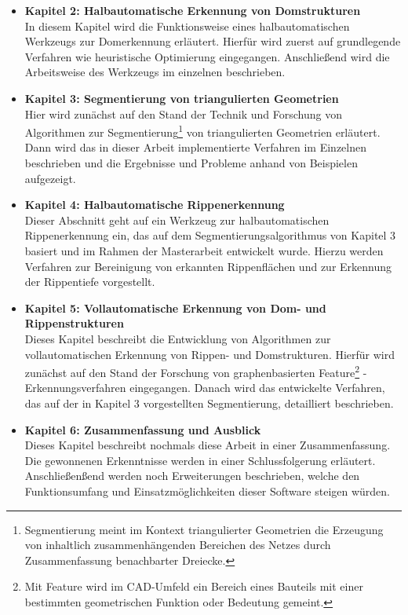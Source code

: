 \begin{itemize}
\item  \textbf{Kapitel 2: Halbautomatische Erkennung von Domstrukturen}\\
In diesem Kapitel wird die Funktionsweise eines halbautomatischen Werkzeugs zur Domerkennung erl\"autert. Hierf\"ur wird zuerst auf grundlegende Verfahren wie heuristische Optimierung eingegangen. Anschließend wird die Arbeitsweise des Werkzeugs im einzelnen beschrieben.

\item  \textbf{Kapitel 3: Segmentierung von triangulierten Geometrien}\\
Hier wird zun\"achst auf den Stand der Technik und Forschung von Algorithmen zur Segmentierung\footnote{Segmentierung meint im Kontext triangulierter Geometrien die Erzeugung von inhaltlich zusammenhängenden Bereichen des Netzes durch Zusammenfassung benachbarter Dreiecke.} von triangulierten Geometrien erl\"autert.
Dann wird das in dieser Arbeit implementierte Verfahren im Einzelnen beschrieben und die Ergebnisse und Probleme anhand von Beispielen aufgezeigt.

\item  \textbf{Kapitel 4: Halbautomatische Rippenerkennung}\\
Dieser Abschnitt geht auf ein Werkzeug zur halbautomatischen Rippenerkennung ein, das auf dem Segmentierungsalgorithmus von Kapitel 3 basiert und im Rahmen der Masterarbeit entwickelt wurde. Hierzu werden Verfahren zur Bereinigung von erkannten Rippenfl\"achen und zur Erkennung der Rippentiefe vorgestellt.

\item  \textbf{Kapitel 5: Vollautomatische Erkennung von Dom- und Rippenstrukturen}\\
Dieses Kapitel beschreibt die Entwicklung von Algorithmen zur vollautomatischen Erkennung von Rippen- und Domstrukturen.
Hierf\"ur wird zun\"achst auf den Stand der Forschung von graphenbasierten Feature\footnote{Mit Feature wird im CAD-Umfeld ein Bereich eines Bauteils mit einer bestimmten geometrischen Funktion oder Bedeutung gemeint.} -Erkennungsverfahren eingegangen. Danach wird das entwickelte Verfahren, das auf der in Kapitel 3 vorgestellten Segmentierung, detailliert beschrieben.

\item  \textbf{Kapitel 6: Zusammenfassung und Ausblick}\\
Dieses Kapitel beschreibt nochmals diese Arbeit in einer Zusammenfassung. Die gewonnenen Erkenntnisse werden in einer Schlussfolgerung erl\"autert. Anschließen{\ss}end werden noch Erweiterungen beschrieben, welche den Funktionsumfang und Einsatzm\"oglichkeiten dieser Software steigen w\"urden.

\end{itemize}

